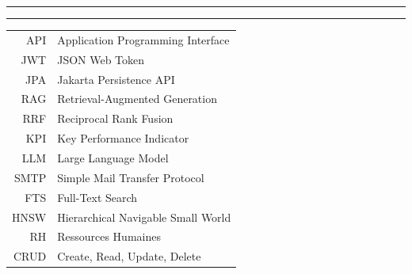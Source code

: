 \documentclass{iid}
\begin{document}
\chapter*{\hfill {}}
\begin{flushright}
\RL{
}
\end{flushright}
\vspace{1cm}
\noindent\rule[2pt]{\textwidth}{0.5pt}
\begin{flushright}
\end{flushright}
\noindent\rule[2pt]{\textwidth}{0.5pt}
\newpage

\dominitoc
\tableofcontents
\newpage
\listoffigures
\newpage
\listoftables
\newpage

\listofsigle
\begin{tabular}{rl}
API & Application Programming Interface \\
JWT & JSON Web Token \\
JPA & Jakarta Persistence API \\
RAG & Retrieval-Augmented Generation \\
RRF & Reciprocal Rank Fusion \\
KPI & Key Performance Indicator \\
LLM & Large Language Model \\
SMTP & Simple Mail Transfer Protocol \\
FTS & Full-Text Search \\
HNSW & Hierarchical Navigable Small World \\
RH & Ressources Humaines \\
CRUD & Create, Read, Update, Delete \\
\end{tabular}
\newpage

\setcounter{page}{1}

\introduction
\fancyhead[L]{\tiny \leftmark}
\fancyhead[R]{\scriptsize \rightmark}
\fancyfoot[C]{\thepage}
\end{document}
